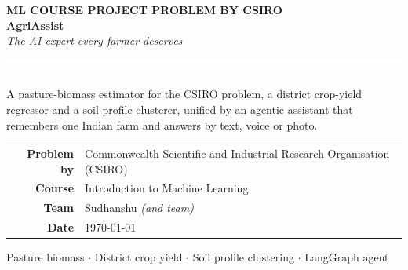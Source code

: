 \documentclass[11pt,a4paper]{article}
\begin{document}
\begin{titlepage}
\centering
\vspace*{1.5cm}
{\color{ochre}\large\bfseries ML COURSE PROJECT \quad\textbullet\quad PROBLEM BY CSIRO}\\[1.4cm]
{\color{forestd}\fontsize{46}{50}\selectfont\bfseries AgriAssist}\\[0.3cm]
{\color{forest}\Large\itshape The AI expert every farmer deserves}\\[1.0cm]
\rule{0.55\textwidth}{1.2pt}\\[0.7cm]
{\large A pasture-biomass estimator for the CSIRO problem, a district crop-yield\\
regressor and a soil-profile clusterer, unified by an agentic assistant that\\
remembers one Indian farm and answers by text, voice or photo.}\\[2.2cm]

\begin{tabular}{rl}
\textbf{Problem by} & Commonwealth Scientific and Industrial Research Organisation (CSIRO)\\[2pt]
\textbf{Course} & Introduction to Machine Learning\\[2pt]
\textbf{Team} & Sudhanshu \textit{(and team)}\\[2pt]
\textbf{Date} & \today\\
\end{tabular}

\vfill
{\small\color{gray} Pasture biomass $\cdot$ District crop yield $\cdot$ Soil profile clustering $\cdot$ LangGraph agent}
\end{titlepage}

\begin{abstract}
\noindent
AgriAssist is an agentic artificial-intelligence agronomist for Indian farmers. A person
describes their farm once and then converses with an agent by text, voice or photograph.
Three trained machine-learning models sit at its core. A \emph{pasture-biomass} estimator
answers the CSIRO challenge of predicting the dry weight of feed from a single photograph; its
final architecture is a two-stream ResNet-50 whose embeddings are concatenated with twelve
hand-crafted green-vegetation statistics and read by five independent gradient-boosted
regressors. A \emph{crop-yield} model is a random forest over the recent district harvest record
for rice, wheat and maize. A \emph{soil-profile} model clusters six-number soil tests with
$k$-means. This report presents the problem framing, the data, the mathematics of each model,
the experiments that led to the final designs (including a diverged transformer baseline and a
Grad-CAM sanity check), the honest evaluation of each, and the LangGraph agent, twelve-tool
interface and three-tier memory that turn these numbers into farming decisions.
\end{abstract}
\end{document}
